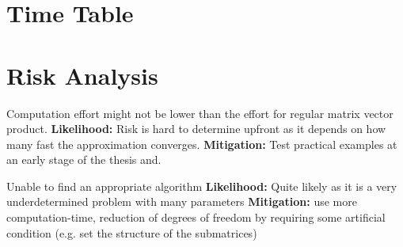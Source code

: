 \documentclass[lang=ngerman,inputenc=utf8,fontsize=10pt]{ldvarticle}
\begin{document}
\section{Time Table}









\section{Risk Analysis}

Computation effort might not be lower than the effort for regular matrix vector product.
\newline\textbf{Likelihood:} Risk is hard to determine upfront as it depends on how many fast the approximation converges.
\newline\textbf{Mitigation:} Test practical examples at an early stage of the thesis and.

Unable to find an appropriate algorithm
\newline\textbf{Likelihood:} Quite likely as it is a very underdetermined problem with many parameters
\newline\textbf{Mitigation:} use more computation-time, reduction of degrees of freedom by requiring some artificial condition (e.g. set the structure of the submatrices)


\printbibliography
\end{document}
